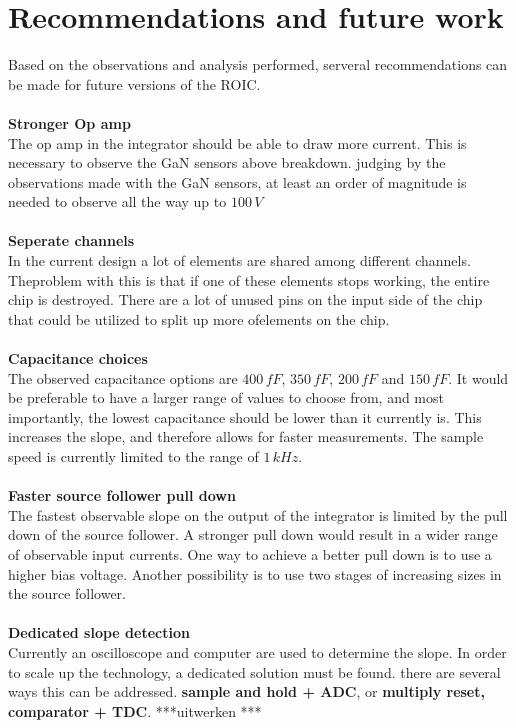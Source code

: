 \section{Recommendations and future work}
Based on the observations and analysis performed, serveral recommendations can be made for future versions of the ROIC.\\
\\
\textbf{Stronger Op amp}\\
The op amp in the integrator should be able to draw more current. This is necessary to observe the GaN sensors above breakdown. judging by the observations made with the GaN sensors, at least an order of magnitude is needed to observe all the way up to $100\,V$\\
\\
\textbf{Seperate channels}\\
In the current design a lot of elements are shared among different channels. Theproblem with this is that if one of these elements stops working, the entire chip is destroyed. There are a lot of unused pins on the input side of the chip that could be utilized to split up more ofelements on the chip.\\
\\
\textbf{Capacitance choices}\\
The observed capacitance options are $400\,fF$, $350\,fF$, $200\,fF$ and $150\,fF$. It would be preferable to have a larger range of values to choose from, and most importantly, the lowest capacitance should be lower than it currently is. This increases the slope, and therefore allows for faster measurements. The sample speed is currently limited to the range of $1\,kHz$. \\
\\
\textbf{Faster source follower pull down}\\
The fastest observable slope on the output of the integrator is limited by the pull down of the source follower. A stronger pull down would result in a wider range of observable input currents. One way to achieve a better pull down is to use a higher bias voltage. Another possibility is to use two stages of increasing sizes in the source follower.\\
\\
\textbf{Dedicated slope detection}\\
Currently an oscilloscope and computer are used to determine the slope. In order to scale up the technology, a dedicated solution must be found. there are several ways this can be addressed. \textbf{sample and hold + ADC}, or \textbf{multiply reset, comparator + TDC}. ***uitwerken *** \\
